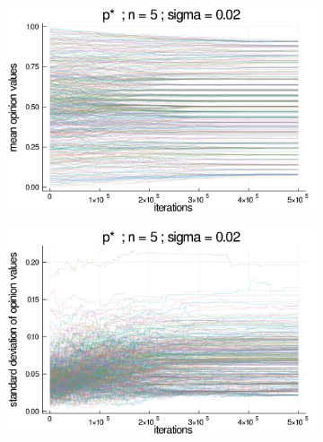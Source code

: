 \documentclass{article}
\begin{document}
    \begin{figure}[H]
      \centering
      \begin{subfigure}[b]{0.48\textwidth}
        \includegraphics[width=\textwidth]{img/series/tseries5/Poodlcalculatep*n5-rho10e-5-sigma002-00intransrandom.png}
      \end{subfigure}
      \begin{subfigure}[b]{0.48\textwidth}
        \includegraphics[width=\textwidth]{img/series/tseries5/Poodlcalculatep*n5-rho10e-5-sigma002-00intransrandom-std.png}
        \end{subfigure}
      \begin{subfigure}[b]{0.48\textwidth}

\end{subfigure}
\end{figure}
\end{document}
